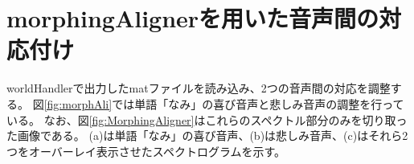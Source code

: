 
\clearpage

\section{morphingAlignerを用いた音声間の対応付け}
\label{sec:morphingAligner}
worldHandlerで出力したmatファイルを読み込み、2つの音声間の対応を調整する。
図\ref{fig:morphAli}では単語「なみ」の喜び音声と悲しみ音声の調整を行っている。
なお、図\ref{fig:MorphingAligner}はこれらのスペクトル部分のみを切り取った画像である。
(a)は単語「なみ」の喜び音声、(b)は悲しみ音声、(c)はそれら2つをオーバーレイ表示させたスペクトログラムを示す。


